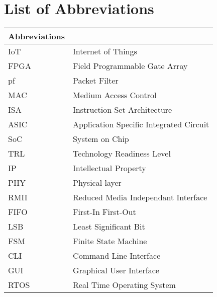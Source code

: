 


\clearpage
\pagestyle{headings}

\chapter[List of Abbreviations ]{List of Abbreviations}


\begin{center}
	\small
	\begin{longtable}{ll}
	\toprule
	Abbreviations & {} \\
	\bottomrule
	
	IoT				& Internet of Things \\
	FPGA				& Field Programmable Gate Array \\
	pf				& Packet Filter \\
	MAC				& Medium Access Control \\
	ISA				& Instruction Set Architecture \\
	ASIC				& Application Specific Integrated Circuit \\
	SoC				& System on Chip \\
	TRL				& Technology Readiness Level \\
	IP				& Intellectual Property \\
	PHY				& Physical layer \\
	RMII			& Reduced Media Independant Interface \\
	FIFO			& First-In First-Out \\
	LSB				& Least Significant Bit \\
	FSM				& Finite State Machine \\
	CLI				& Command Line Interface \\
	GUI				& Graphical User Interface \\
	RTOS			& Real Time Operating System \\
	\hline
	\end{longtable}
\end{center}

\clearpage

\tableofcontents
	\clearpage
\listoffigures
\listoftables



